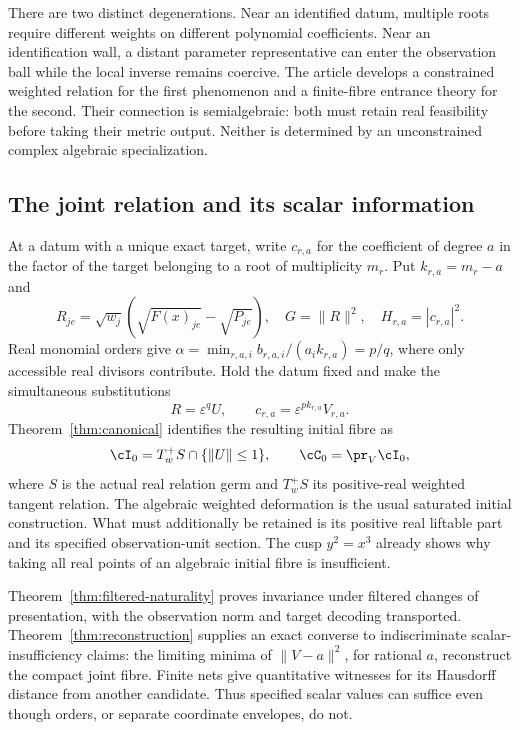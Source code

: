 There are two distinct degenerations. Near an identified datum, multiple
roots require different weights on different polynomial coefficients.
Near an identification wall, a distant parameter representative can enter
the observation ball while the local inverse remains coercive. The
article develops a constrained weighted relation for the first phenomenon
and a finite-fibre entrance theory for the second. Their connection is
semialgebraic: both must retain real feasibility before taking their
metric output. Neither is determined by an unconstrained complex
algebraic specialization.

\subsection*{The joint relation and its scalar information}
At a datum with a unique exact target, write $c_{r,a}$ for the coefficient
of degree $a$ in the factor of the target belonging to a root of
multiplicity $m_r$. Put $k_{r,a}=m_r-a$ and
\[
 R_{je}=\sqrt{w_j}(\sqrt{F(x)_{je}}-\sqrt{P_{je}}),\quad
 G=\|R\|^2,\quad H_{r,a}=|c_{r,a}|^2.
\]
Real monomial orders give
$\alpha=\min_{r,a,i}b_{r,a,i}/(a_i k_{r,a})=p/q$, where only
accessible real divisors contribute. Hold the datum fixed and make the
simultaneous substitutions
\[
 R=\varepsilon^q U,\qquad
 c_{r,a}=\varepsilon^{p k_{r,a}}V_{r,a}.
\]
Theorem~\ref{thm:canonical} identifies the resulting initial fibre as
\[
 \cI_0=T_w^+S\cap\{\|U\|\le1\},\qquad
 \cC_0=\pr_V\cI_0,
\]
where $S$ is the actual real relation germ and $T_w^+S$ its positive-real
weighted tangent relation. The algebraic weighted deformation is the
usual saturated initial construction. What must additionally be retained
is its positive real liftable part and its specified observation-unit
section. The cusp $y^2=x^3$ already shows why taking all real points of an
algebraic initial fibre is insufficient.

Theorem~\ref{thm:filtered-naturality} proves invariance under filtered
changes of presentation, with the observation norm and target decoding
transported. Theorem~\ref{thm:reconstruction} supplies an exact converse
to indiscriminate scalar-insufficiency claims: the limiting minima of
$\|V-a\|^2$, for rational $a$, reconstruct the compact joint fibre.
Finite nets give quantitative witnesses for its Hausdorff distance from
another candidate. Thus specified scalar values can suffice even though
orders, or separate coordinate envelopes, do not.

